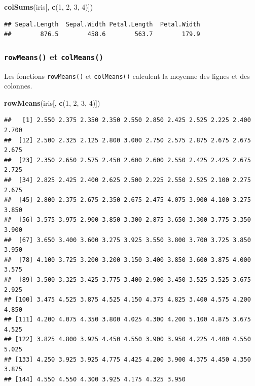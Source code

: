 \documentclass[]{book}
\newenvironment{Shaded}{\begin{snugshade}}{\end{snugshade}}
\newcommand{\DecValTok}[1]{\textcolor[rgb]{0.00,0.00,0.81}{#1}}
\newcommand{\KeywordTok}[1]{\textcolor[rgb]{0.13,0.29,0.53}{\textbf{#1}}}
\newcommand{\NormalTok}[1]{#1}
\begin{document}
\begin{Shaded}
\begin{Highlighting}[]
\KeywordTok{colSums}\NormalTok{(iris[, }\KeywordTok{c}\NormalTok{(}\DecValTok{1}\NormalTok{, }\DecValTok{2}\NormalTok{, }\DecValTok{3}\NormalTok{, }\DecValTok{4}\NormalTok{)])}
\end{Highlighting}
\end{Shaded}

\begin{verbatim}
## Sepal.Length  Sepal.Width Petal.Length  Petal.Width 
##        876.5        458.6        563.7        179.9
\end{verbatim}

\hypertarget{l015rowmeans}{%
\subsubsection{\texorpdfstring{\texttt{rowMeans()} et \texttt{colMeans()}}{rowMeans() et colMeans()}}\label{l015rowmeans}}

Les fonctions \texttt{rowMeans()} et \texttt{colMeans()} calculent la moyenne des lignes et des colonnes.

\begin{Shaded}
\begin{Highlighting}[]
\KeywordTok{rowMeans}\NormalTok{(iris[, }\KeywordTok{c}\NormalTok{(}\DecValTok{1}\NormalTok{, }\DecValTok{2}\NormalTok{, }\DecValTok{3}\NormalTok{, }\DecValTok{4}\NormalTok{)])}
\end{Highlighting}
\end{Shaded}

\begin{verbatim}
##   [1] 2.550 2.375 2.350 2.350 2.550 2.850 2.425 2.525 2.225 2.400 2.700
##  [12] 2.500 2.325 2.125 2.800 3.000 2.750 2.575 2.875 2.675 2.675 2.675
##  [23] 2.350 2.650 2.575 2.450 2.600 2.600 2.550 2.425 2.425 2.675 2.725
##  [34] 2.825 2.425 2.400 2.625 2.500 2.225 2.550 2.525 2.100 2.275 2.675
##  [45] 2.800 2.375 2.675 2.350 2.675 2.475 4.075 3.900 4.100 3.275 3.850
##  [56] 3.575 3.975 2.900 3.850 3.300 2.875 3.650 3.300 3.775 3.350 3.900
##  [67] 3.650 3.400 3.600 3.275 3.925 3.550 3.800 3.700 3.725 3.850 3.950
##  [78] 4.100 3.725 3.200 3.200 3.150 3.400 3.850 3.600 3.875 4.000 3.575
##  [89] 3.500 3.325 3.425 3.775 3.400 2.900 3.450 3.525 3.525 3.675 2.925
## [100] 3.475 4.525 3.875 4.525 4.150 4.375 4.825 3.400 4.575 4.200 4.850
## [111] 4.200 4.075 4.350 3.800 4.025 4.300 4.200 5.100 4.875 3.675 4.525
## [122] 3.825 4.800 3.925 4.450 4.550 3.900 3.950 4.225 4.400 4.550 5.025
## [133] 4.250 3.925 3.925 4.775 4.425 4.200 3.900 4.375 4.450 4.350 3.875
## [144] 4.550 4.550 4.300 3.925 4.175 4.325 3.950
\end{verbatim}
\end{document}
